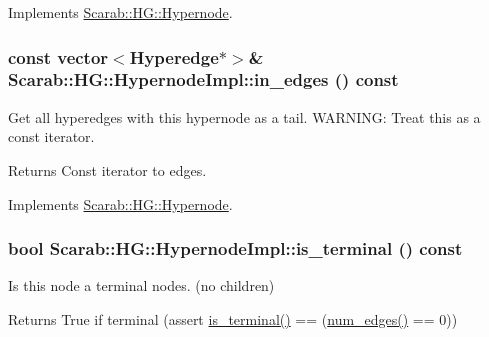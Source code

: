 Implements \hyperlink{class_scarab_1_1_h_g_1_1_hypernode_a533d3e0bc2269ec07edbda32305daf70}{Scarab::HG::Hypernode}.

\hypertarget{class_scarab_1_1_h_g_1_1_hypernode_impl_a77fe0de2e3927be6145cb8fc018088c9}{
\subsubsection[{in\_\-edges}]{\setlength{\rightskip}{0pt plus 5cm}const vector$<${\bf Hyperedge}$\ast$$>$\& Scarab::HG::HypernodeImpl::in\_\-edges () const}}
\label{class_scarab_1_1_h_g_1_1_hypernode_impl_a77fe0de2e3927be6145cb8fc018088c9}
Get all hyperedges with this hypernode as a tail. WARNING: Treat this as a const iterator. \begin{DoxyReturn}{Returns}
Const iterator to edges. 
\end{DoxyReturn}


Implements \hyperlink{class_scarab_1_1_h_g_1_1_hypernode_aad118748408663b8242dc52d45bbd49d}{Scarab::HG::Hypernode}.

\hypertarget{class_scarab_1_1_h_g_1_1_hypernode_impl_a2bb4b33ff207c3c1babe135b9af6323e}{
\subsubsection[{is\_\-terminal}]{\setlength{\rightskip}{0pt plus 5cm}bool Scarab::HG::HypernodeImpl::is\_\-terminal () const}}
\label{class_scarab_1_1_h_g_1_1_hypernode_impl_a2bb4b33ff207c3c1babe135b9af6323e}
Is this node a terminal nodes. (no children)

\begin{DoxyReturn}{Returns}
True if terminal (assert \hyperlink{class_scarab_1_1_h_g_1_1_hypernode_impl_a2bb4b33ff207c3c1babe135b9af6323e}{is\_\-terminal()} == (\hyperlink{class_scarab_1_1_h_g_1_1_hypernode_impl_a7fed4809706319cc916ed4c04a641436}{num\_\-edges()} == 0)) 
\end{DoxyReturn}



